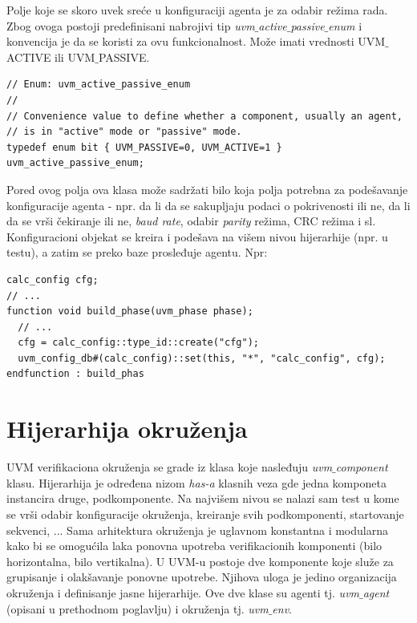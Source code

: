 Polje koje se skoro uvek sreće u konfiguraciji agenta je za odabir režima rada.
Zbog ovoga postoji predefinisani nabrojivi tip
\emph{uvm\(\_\)active\(\_\)passive\(\_\)enum} i konvencija je da se koristi za
ovu funkcionalnost. Može imati vrednosti UVM\(\_\)ACTIVE ili UVM\(\_\)PASSIVE.

\begin{lstlisting}
// Enum: uvm_active_passive_enum
//
// Convenience value to define whether a component, usually an agent,
// is in "active" mode or "passive" mode.
typedef enum bit { UVM_PASSIVE=0, UVM_ACTIVE=1 } uvm_active_passive_enum;
\end{lstlisting}

Pored ovog polja ova klasa može sadržati bilo koja polja potrebna za podešavanje
konfiguracije agenta - npr. da li da se sakupljaju podaci o pokrivenosti ili ne,
da li da se vrši čekiranje ili ne, \emph{baud rate}, odabir \emph{parity}
režima, CRC režima i sl.\\

Konfiguracioni objekat se kreira i podešava na višem nivou hijerarhije (npr. u
testu), a zatim se preko baze prosleđuje agentu. Npr:

\begin{lstlisting}
calc_config cfg;
// ...
function void build_phase(uvm_phase phase);
  // ...
  cfg = calc_config::type_id::create("cfg");
  uvm_config_db#(calc_config)::set(this, "*", "calc_config", cfg);
endfunction : build_phas
\end{lstlisting}


\section{Hijerarhija okruženja}

UVM verifikaciona okruženja se grade iz klasa koje nasleđuju
\emph{uvm\(\_\)component} klasu. Hijerarhija je određena nizom \emph{has-a}
klasnih veza gde jedna komponeta instancira druge, podkomponente. Na najvišem
nivou se nalazi sam test u kome se vrši odabir konfiguracije okruženja,
kreiranje svih podkomponenti, startovanje sekvenci, ... Sama arhitektura
okruženja je uglavnom konstantna i modularna kako bi se omogućila laka ponovna
upotreba verifikacionih komponenti (bilo horizontalna, bilo vertikalna). U UVM-u
postoje dve komponente koje služe za grupisanje i olakšavanje ponovne upotrebe.
Njihova uloga je jedino organizacija okruženja i definisanje jasne hijerarhije.
Ove dve klase su agenti tj. \emph{uvm\(\_\)agent} (opisani u prethodnom
poglavlju) i okruženja tj. \emph{uvm\(\_\)env}.

